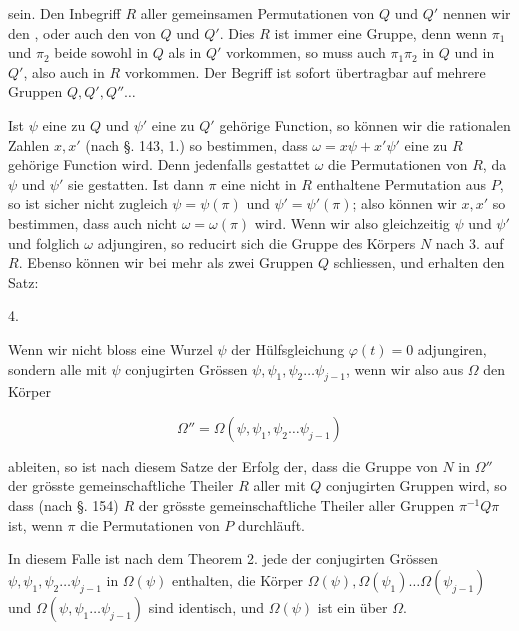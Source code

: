 sein. Den Inbegriff $R$ aller gemeinsamen Permutationen von $Q$
und $Q'$ nennen wir den ,
oder auch den  von $Q$ und $Q'$. Dies $R$ ist immer eine
Gruppe, denn wenn $\pi_1$ und $\pi_2$ beide sowohl in $Q$ als in $Q'$
vorkommen, so muss auch $\pi_1 \pi_2$ in $Q$ und in $Q'$, also auch in $R$
vorkommen. Der Begriff ist sofort übertragbar auf mehrere
Gruppen $Q, Q', Q'' \ldots$

Ist $\psi$ eine zu $Q$ und $\psi'$ eine zu $Q'$ gehörige Function, so
können wir die rationalen Zahlen $x, x'$ (nach §. 143, 1.) so bestimmen,
dass $\omega = x\psi + x'\psi'$ eine zu $R$ gehörige Function
wird. Denn jedenfalls gestattet $\omega$ die Permutationen von $R$, da
$\psi$ und $\psi'$ sie gestatten. Ist dann $\pi$ eine nicht in $R$ enthaltene
Permutation aus $P$, so ist sicher nicht zugleich $\psi = \psi(\pi)$ und
$\psi' = \psi'(\pi)$; also können wir $x, x'$ so bestimmen, dass auch nicht
$\omega = \omega(\pi)$ wird. Wenn wir also gleichzeitig $\psi$ und $\psi'$ und folglich
 $\omega$ adjungiren, so reducirt sich die Gruppe des Körpers $N$
nach 3. auf $R$. Ebenso können wir bei mehr als zwei Gruppen $Q$
schliessen, und erhalten den Satz:

4. 

Wenn wir nicht bloss eine Wurzel $\psi$ der Hülfsgleichung
$\varphi(t) = 0$ adjungiren, sondern alle mit $\psi$ conjugirten Grössen
$\psi, \psi_1, \psi_2 \ldots \psi_{j-1}$, wenn wir also aus $\Omega$ den Körper

\[
\Omega'' = \Omega(\psi, \psi_1, \psi_2 \ldots \psi_{j-1})
\]

ableiten, so ist nach diesem Satze der Erfolg der, dass die
Gruppe von $N$ in $\Omega''$ der grösste gemeinschaftliche Theiler $R$
aller mit $Q$ conjugirten Gruppen wird, so dass (nach §. 154)
$R$ der grösste gemeinschaftliche Theiler aller Gruppen $\pi^{-1}Q\pi$
ist, wenn $\pi$ die Permutationen von $P$ durchläuft.

 In diesem
Falle ist nach dem Theorem 2. jede der conjugirten Grössen
$\psi, \psi_1, \psi_2 \ldots \psi_{j-1}$ in $\Omega(\psi)$ enthalten, die Körper
$\Omega(\psi), \Omega(\psi_1) \ldots \Omega(\psi_{j-1})$ und $\Omega(\psi, \psi_1 \ldots \psi_{j-1})$ sind identisch,
und $\Omega(\psi)$ ist ein  über $\Omega$.
